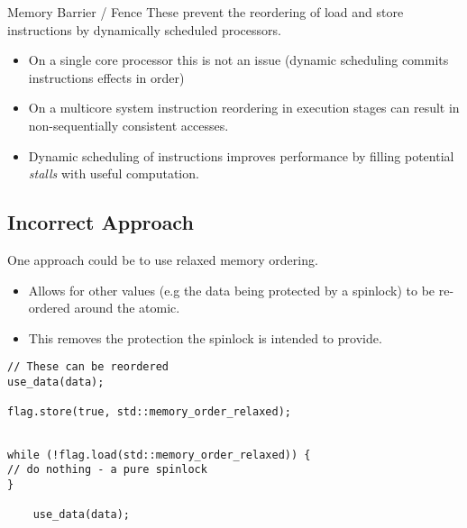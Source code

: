 \begin{definitionbox}{Memory Barrier / Fence}
  These prevent the reordering of load and store instructions by dynamically scheduled processors.
  \begin{itemize}
    \item On a single core processor this is not an issue (dynamic scheduling commits instructions effects in order)
    \item On a multicore system instruction reordering in execution stages can result in non-sequentially consistent accesses.
    \item Dynamic scheduling of instructions improves performance by filling potential \textit{stalls} with useful computation.
  \end{itemize}
\end{definitionbox}

\subsection{Incorrect Approach}
One approach could be to use relaxed memory ordering.
\begin{itemize}
  \item Allows for other values (e.g the data being protected by a spinlock) to be re-ordered around the atomic.
  \item This removes the protection the spinlock is intended to provide.
\end{itemize}
\noindent
\begin{minipage}{.49\textwidth}
    \begin{verbatim}
// These can be reordered
use_data(data);

flag.store(true, std::memory_order_relaxed);
  
    \end{verbatim}
  \end{minipage}
  \hfill
  \begin{minipage}{.49\textwidth}
    \begin{verbatim}
while (!flag.load(std::memory_order_relaxed)) {
// do nothing - a pure spinlock
}

    use_data(data);
    \end{verbatim}
  \end{minipage}

